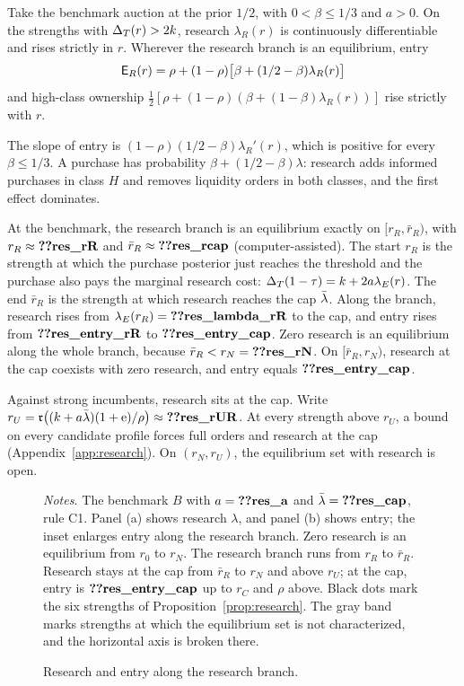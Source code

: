 \begin{corollary}\label{prop:researchbranch}
Take the benchmark auction at the prior \(1/2\), with \(0<\beta\le1/3\) and \(a>0\). On the strengths with
\(\Delta_T(r)>2k\), research \(\lambda_R(r)\) is continuously differentiable and rises strictly in \(r\). Wherever the
research branch is an equilibrium, entry
\[
\mathsf{E}_R(r)=\rho+(1-\rho)\bigl[\beta+(1/2-\beta)\lambda_R(r)\bigr]
\]
and high-class ownership \(\tfrac12[\rho+(1-\rho)(\beta+(1-\beta)\lambda_R(r))]\) rise strictly with \(r\).
\end{corollary}

The slope of entry is \((1-\rho)(1/2-\beta)\lambda_R'(r)\), which is positive for every \(\beta\le1/3\). A purchase
has probability \(\beta+(1/2-\beta)\lambda\): research adds informed purchases in class \(H\) and removes liquidity
orders in both classes, and the first effect dominates.

At the benchmark, the research branch is an equilibrium exactly on \([r_R,\bar r_R)\), with \(r_R\approx\reg{res_rR}\)
and \(\bar r_R\approx\reg{res_rcap}\) (computer-assisted). The start \(r_R\) is the strength at which the purchase
posterior just reaches the threshold and the purchase also pays the marginal research cost:
\(\Delta_T(1-\tau)=k+2a\lambda_E(r)\). The end \(\bar r_R\) is the strength at which research reaches the cap \(\bar\lambda\). Along
the branch, research rises from \(\lambda_E(r_R)=\reg{res_lambda_rR}\) to the cap, and entry rises from
\(\reg{res_entry_rR}\) to \(\reg{res_entry_cap}\). Zero research is an equilibrium along the whole branch, because
\(\bar r_R<r_N=\reg{res_rN}\). On \([\bar r_R,r_N)\), research at the cap coexists with zero research, and entry equals
\(\reg{res_entry_cap}\).

Against strong incumbents, research sits at the cap. Write
\(r_U=\fr\bigl((k+a\lb)(1+\eu)/\rho\bigr)\approx\reg{res_rUR}\). At every strength above \(r_U\), a bound on every
candidate profile forces full orders and research at the cap (Appendix~\ref{app:research}). On \((r_N,r_U)\), the
equilibrium set with research is open.

\begin{figure}[tbp]
\centering
{}
\caption{Research and entry along the research branch.}\label{fig:research}
\par\medskip
\begin{minipage}{\linewidth}\footnotesize\singlespacing
\textit{Notes.} The benchmark \(B\) with \(a=\reg{res_a}\) and \(\lb=\reg{res_cap}\), rule C1. Panel (a) shows
research \(\lambda\), and panel (b) shows entry; the inset enlarges entry along the research branch. Zero research is an
equilibrium from \(r_0\) to \(r_N\). The research branch runs from \(r_R\) to \(\bar r_R\). Research stays at the cap
from \(\bar r_R\) to \(r_N\) and above \(r_U\); at the cap, entry is \(\reg{res_entry_cap}\) up to \(r_C\) and
\(\rho\) above. Black dots mark the six strengths of Proposition~\ref{prop:research}. The gray band marks strengths
at which the equilibrium set is not characterized, and the horizontal axis is broken there.
\end{minipage}
\end{figure}

